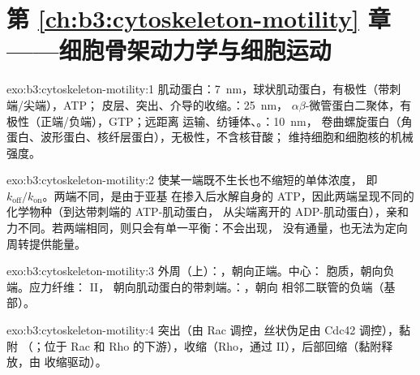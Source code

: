 \section*{第 \ref{ch:b3:cytoskeleton-motility} 章——细胞骨架动力学与细胞运动}

\begin{solution}{exo:b3:cytoskeleton-motility:1}
肌动蛋白：\qty{7}{nm}，球状肌动蛋白，有极性（带刺端/尖端），ATP；
皮层、突出、介导的收缩。：\qty{25}{nm}，
$\alpha\beta$-微管蛋白二聚体，有极性（正端/负端），GTP；远距离
运输、纺锤体、。：\qty{10}{nm}，
卷曲螺旋蛋白（角蛋白、波形蛋白、核纤层蛋白），无极性，不含核苷酸；
维持细胞和细胞核的机械强度。
\end{solution}

\begin{solution}{exo:b3:cytoskeleton-motility:2}
使某一端既不生长也不缩短的单体浓度，
即 $k_{\mathrm{off}}/k_{\mathrm{on}}$。两端不同，是由于亚基
在掺入后水解自身的 ATP，因此两端呈现不同的
化学物种（到达带刺端的 ATP-肌动蛋白，
从尖端离开的 ADP-肌动蛋白），亲和力不同。若两端相同，则只会有单一平衡：不会出现，
没有通量，也无法为定向周转提供能量。
\end{solution}

\begin{solution}{exo:b3:cytoskeleton-motility:3}
外周（上）：，朝向正端。中心：
胞质，朝向负端。应力纤维： II，
朝向肌动蛋白的带刺端。：，朝向
相邻二联管的负端（基部）。
\end{solution}

\begin{solution}{exo:b3:cytoskeleton-motility:4}
突出（由 Rac 调控，丝状伪足由 Cdc42 调控），黏附
（；位于 Rac 和 Rho 的下游），收缩（Rho，通过
 II），后部回缩（黏附释放，由
收缩驱动）。
\end{solution}

